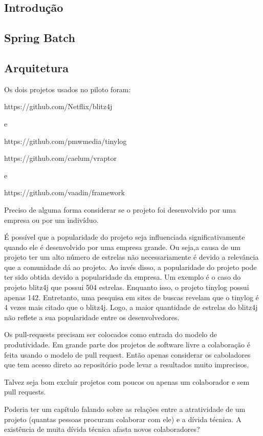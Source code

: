 \subsection{Introdução}
\subsection{Spring Batch}
\subsection{Arquitetura}



Os dois projetos usados no piloto foram:

https://github.com/Netflix/blitz4j

e

https://github.com/pmwmedia/tinylog



https://github.com/caelum/vraptor

e 

https://github.com/vaadin/framework




Preciso de alguma forma considerar se o projeto foi desenvolvido por uma empresa ou por um indivíduo.

É possível que a popularidade do projeto seja influenciada significativamente quando ele é desenvolvido por uma empresa grande. Ou seja,a causa de um projeto ter um alto número de estrelas não necessariamente é devido a relevância que a comunidade dá ao projeto. Ao invés disso, a popularidade do projeto pode ter sido obtida devido a popularidade da empresa. Um exemplo é o caso do projeto blitz4j que possui 504 estrelas. Enquanto isso, o projeto tinylog possui apenas 142. Entretanto, uma pesquisa em sites de buscas revelam que o tinylog é 4 vezes mais citado que o blitz4j. Logo, a maior quantidade de estrelas do blitz4j não reflete a sua popularidade entre os desenvolvedores.

Os pull-requests precisam ser colocados como entrada do modelo de produtividade. Em grande parte dos projetos de software livre a colaboração é feita usando o modelo de pull request. Então apenas considerar os caboladores que tem acesso direto ao repositório pode levar a resultados muito imprecisos.


Talvez seja bom excluir projetos com poucos ou apenas um colaborador e sem pull requests. 


Poderia ter um capítulo falando sobre as relações entre a atratividade de um projeto (quantas pessoas procuram colaborar com ele) e a dívida técnica.
A existência de muita dívida técnica afasta novos colaboradores?


